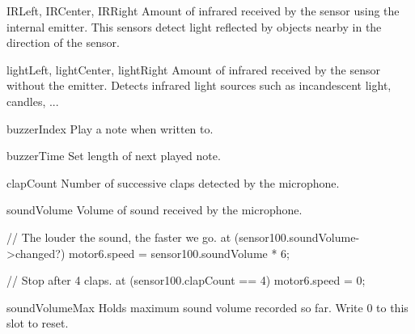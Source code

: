 \begin{urbiscriptapi}

\item[IRLeft, IRCenter, IRRight] Amount of infrared received by the sensor
  using the internal emitter. This sensors detect light reflected by objects
  nearby in the direction of the sensor.

\item[lightLeft, lightCenter, lightRight] Amount of infrared received by the
  sensor without the emitter. Detects infrared light sources such as
  incandescent light, candles, ...

\item[buzzerIndex]
  Play a note when written to.

\item[buzzerTime]
  Set length of next played note.

\item[clapCount]
  Number of successive claps detected by the microphone.

\item[soundVolume]
  Volume of sound received by the microphone.

\begin{urbiunchecked}
// The louder the sound, the faster we go.
at (sensor100.soundVolume->changed?)
  motor6.speed = sensor100.soundVolume * 6;

// Stop after 4 claps.
at (sensor100.clapCount == 4)
  motor6.speed = 0;
\end{urbiunchecked}

\item[soundVolumeMax] Holds maximum sound volume recorded so far. Write 0 to
  this slot to reset.

\end{urbiscriptapi}


